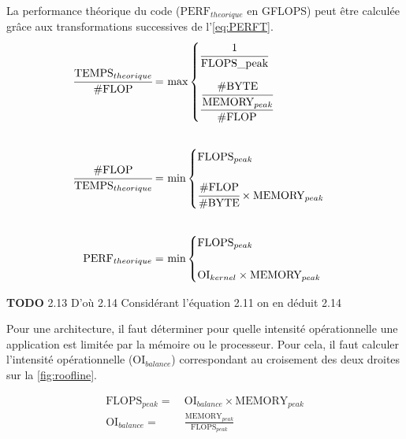             
            
            
            La performance théorique du code ($\text{PERF}_{theorique}$ en GFLOPS) peut être calculée grâce aux transformations successives de l'\autoref{eq:PERFT}.
            \begin{equation}
            \begin{aligned}
            \label{eq:PERFT}
            \cfrac{\text{TEMPS}_{theorique}}{\text{\#FLOP}}  =\ &\text{max}
            \begin{cases} 
                \cfrac {1}{\text{FLOPS\_{peak}}}    \\[15pt]  
                \cfrac {\cfrac{\text{\#BYTE}}{\text{MEMORY}_{peak}}}{\text{\#FLOP}} 
            \end{cases}\\[20pt]
            \cfrac{\text{\#FLOP}}{\text{TEMPS}_{theorique}}  =\ &\text{min}
            \begin{cases} 
                \text{FLOPS}_{peak}    \\[15pt]  
                \cfrac{\text{\#FLOP}}{\text{\#BYTE}} \times \text{MEMORY}_{peak}
            \end{cases}\\[20pt]
            \text{PERF}_{theorique}  =\ &\text{min}
            \begin{cases} 
                \text{FLOPS}_{peak}    \\[15pt]  
                \text{OI}_{kernel} \times \text{MEMORY}_{peak} 
            \end{cases}
            \end{aligned}
            \end{equation}
            
            \textbf{TODO}
            2.13
                D'où
            2.14
                Considérant l'équation 2.11 on en déduit
            2.14
                
            Pour une architecture, il faut déterminer pour quelle intensité opérationnelle une application est limitée par la mémoire ou le processeur. Pour cela, il faut calculer l’intensité opérationnelle ($\text{OI}_{balance}$) correspondant au croisement des deux droites sur la \autoref{fig:roofline}. 
            
            \begin{equation}
            \begin{aligned}
             \text{FLOPS}_{peak} =\ &\text{OI}_{balance} \times \text{MEMORY}_{peak} \\[20pt]
             \text{OI}_{balance} =\ &\frac{\text{MEMORY}_{peak}} {\text{FLOPS}_{peak}} 
            \end{aligned}
            \end{equation}
            
